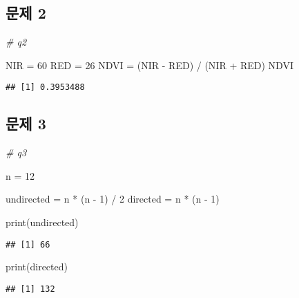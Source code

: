 \documentclass[
]{article}
\newenvironment{Shaded}{\begin{snugshade}}{\end{snugshade}}
\newcommand{\CommentTok}[1]{\textcolor[rgb]{0.56,0.35,0.01}{\textit{#1}}}
\newcommand{\DecValTok}[1]{\textcolor[rgb]{0.00,0.00,0.81}{#1}}
\newcommand{\FunctionTok}[1]{\textcolor[rgb]{0.00,0.00,0.00}{#1}}
\newcommand{\NormalTok}[1]{#1}
\newcommand{\OtherTok}[1]{\textcolor[rgb]{0.56,0.35,0.01}{#1}}
\newcommand{\SpecialCharTok}[1]{\textcolor[rgb]{0.00,0.00,0.00}{#1}}
\begin{document}
\hypertarget{uxbb38uxc81c-2}{%
\subsection{문제 2}\label{uxbb38uxc81c-2}}

\begin{Shaded}
\begin{Highlighting}[]
\CommentTok{\# q2}

\NormalTok{NIR }\OtherTok{=} \DecValTok{60}
\NormalTok{RED }\OtherTok{=} \DecValTok{26}
\NormalTok{NDVI }\OtherTok{=}\NormalTok{ (NIR }\SpecialCharTok{{-}}\NormalTok{ RED) }\SpecialCharTok{/}\NormalTok{ (NIR }\SpecialCharTok{+}\NormalTok{ RED)}
\NormalTok{NDVI}
\end{Highlighting}
\end{Shaded}

\begin{verbatim}
## [1] 0.3953488
\end{verbatim}

\hypertarget{uxbb38uxc81c-3}{%
\subsection{문제 3}\label{uxbb38uxc81c-3}}

\begin{Shaded}
\begin{Highlighting}[]
\CommentTok{\# q3}

\NormalTok{n }\OtherTok{=} \DecValTok{12}

\NormalTok{undirected }\OtherTok{=}\NormalTok{ n }\SpecialCharTok{*}\NormalTok{ (n }\SpecialCharTok{{-}} \DecValTok{1}\NormalTok{) }\SpecialCharTok{/} \DecValTok{2}
\NormalTok{directed }\OtherTok{=}\NormalTok{ n }\SpecialCharTok{*}\NormalTok{ (n }\SpecialCharTok{{-}} \DecValTok{1}\NormalTok{)}

\FunctionTok{print}\NormalTok{(undirected)}
\end{Highlighting}
\end{Shaded}

\begin{verbatim}
## [1] 66
\end{verbatim}

\begin{Shaded}
\begin{Highlighting}[]
\FunctionTok{print}\NormalTok{(directed)}
\end{Highlighting}
\end{Shaded}

\begin{verbatim}
## [1] 132
\end{verbatim}
\end{document}
